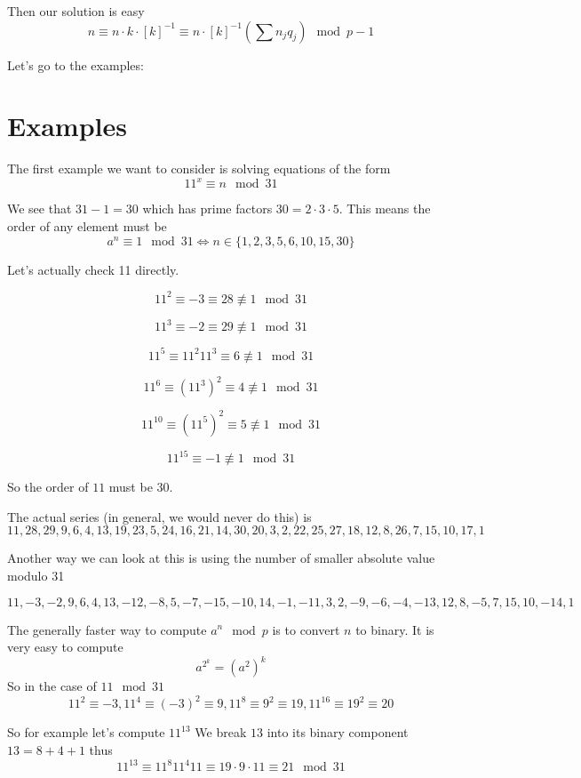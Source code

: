 \documentclass[16 pt]{amsart}
\theoremstyle{definition}
\theoremstyle{remark}
\numberwithin{equation}{subsection}
\begin{document}
Then our solution is easy
\[
n \equiv n\cdot k \cdot [k]^{-1} \equiv n\cdot [k]^{-1} (\sum n_j q_j) \mod{p-1}
\]

Let's go to the examples:








\section*{Examples}

The first example we want to consider is solving equations of the form 
\[
11^x \equiv n \mod{31}
\]

We see that $31-1=30$ which has prime factors $30 = 2\cdot 3\cdot 5$.  This means the order of any element must be
\[
a^n \equiv 1 \mod{31} \iff n\in \{1,2,3,5,6,10,15,30\}
\]

Let's actually check 11 directly.

\[
11^2\equiv -3 \equiv 28 \not\equiv 1 \mod{31}
\]

\[
11^3\equiv -2 \equiv 29 \not\equiv 1 \mod{31}
\]

\[
11^5\equiv 11^2 11^3 \equiv 6 \not\equiv 1 \mod{31}
\]

\[
11^6\equiv (11^3)^2 \equiv 4 \not\equiv 1 \mod{31}
\]

\[
11^{10}\equiv (11^5)^2 \equiv 5 \not\equiv 1 \mod{31}
\]

\[
11^{15} \equiv -1  \not\equiv 1 \mod{31}
\]

So the order of $11$ must be $30$.

The actual series (in general, we would never do this) is
\[
11,28,29,9,6,4,13,19,23,5,24,16,21,14,30,20,3,2,22,25,27,18,12,8,26,7,15,10,17,1
\]


Another way we can look at this is using the number of smaller absolute value modulo 31

\[
11,-3,-2,9,6,4,13,-12,-8,5,-7,-15,-10,14,-1,-11,3,2,-9,-6,-4,-13,12,8,-5,7,15,10,-14,1
\]

The generally faster way to compute $a^n \mod{p}$ is to convert $n$ to binary.  It is very easy to compute
\[
a^{2^k} = (a^2)^k
\]
So in the case of $11 \mod{31}$
\[
11^2 \equiv -3, 11^4 \equiv (-3)^2 \equiv 9, 11^8 \equiv 9^2 \equiv 19, 11^{16}\equiv 19^2 \equiv 20
\]

So for example let's compute $11^{13}$  We break $13$ into its binary component $13 = 8 + 4 +1$ thus
\[
11^{13} \equiv 11^8 11^4 11 \equiv 19\cdot 9 \cdot 11 \equiv 21 \mod{31}
\]
\end{document}
